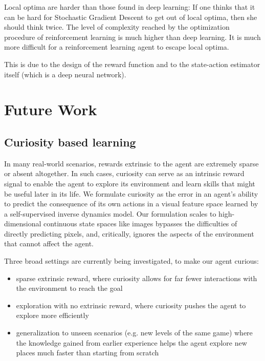 \documentclass[conference]{IEEEtran}
\begin{document}
Local optima are harder than those found in deep learning: If one thinks that it can be hard for Stochastic Gradient Descent to get out of local optima, then she should think twice. The level of complexity reached by the optimization procedure of reinforcement learning is much higher than deep learning. It is much more difficult for a reinforcement learning agent to escape local optima.

This is due to the design of the reward function and to the state-action estimator itself (which is a deep neural network).

\section{Future Work}

\subsection{\textbf{Curiosity based learning}}

In many real-world scenarios, rewards extrinsic to the agent are extremely sparse or absent altogether. In such cases, curiosity can serve as an intrinsic reward signal to enable the agent to explore its environment and learn skills that might be useful later in its life. We formulate curiosity as the error in an agent's ability to predict the consequence of its own actions in a visual feature space learned by a self-supervised inverse dynamics model. Our formulation scales to high-dimensional continuous state spaces like images bypasses the difficulties of directly predicting pixels, and, critically, ignores the aspects of the environment that cannot affect the agent.

Three broad settings are currently being investigated, to make our agent curious:

\begin{itemize}
\item sparse extrinsic reward, where curiosity allows for far fewer interactions with the environment to reach the goal
\item exploration with no extrinsic reward, where curiosity pushes the agent to explore more efficiently
\item generalization to unseen scenarios (e.g. new levels of the same game) where the knowledge gained from earlier experience helps the agent explore new places much faster than starting from scratch
\end{itemize}
\end{document}
